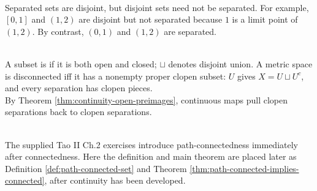 \begin{remark} \label{rem:disjoint-versus-separated} \\
Separated sets are disjoint, but disjoint sets need not be separated. For example, $[0,1]$ and $(1,2)$ are disjoint but not separated because $1$ is a limit point of $(1,2)$. By contrast, $(0,1)$ and $(1,2)$ are separated.
\end{remark}

\begin{remark} \label{rem:connectedness-and-clopen-subsets} \\
A subset is  if it is both open and closed; $\sqcup$ denotes disjoint union. A metric space is disconnected iff it has a nonempty proper clopen subset: $U$ gives $X=U\sqcup U^c$, and every separation has clopen pieces.\\
By Theorem \ref{thm:continuity-open-preimages}, continuous maps pull clopen separations back to clopen separations.
\end{remark}

\begin{remark} \label{rem:path-connectedness-placed-with-continuity} \\
The supplied Tao II Ch.2 exercises introduce path-connectedness immediately after connectedness. Here the definition and main theorem are placed later as Definition \ref{def:path-connected-set} and Theorem \ref{thm:path-connected-implies-connected}, after continuity has been developed.
\end{remark}

